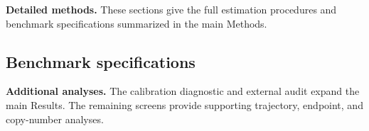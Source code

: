 \setcounter{figure}{0} \setcounter{table}{0}
\renewcommand{\thefigure}{S\arabic{figure}}
\renewcommand{\thetable}{S\arabic{table}}
\renewcommand{\figurename}{Supplementary Figure}
\renewcommand{\tablename}{Supplementary Table}

\noindent\textbf{Detailed methods.}
These sections give the full estimation procedures and benchmark
specifications summarized in the main Methods.



\subsection{Benchmark specifications}









\bigskip
\noindent\textbf{Additional analyses.}
The calibration diagnostic and external audit expand the main Results.
The remaining screens provide supporting trajectory, endpoint, and
copy-number analyses.







